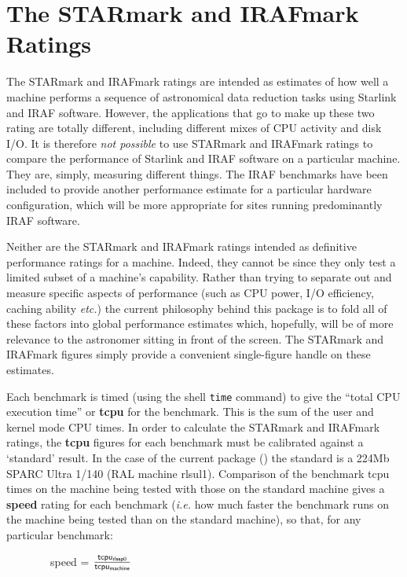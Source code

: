 \newpage
\section{The STARmark and IRAFmark Ratings}
\label{starmark}

The STARmark and IRAFmark ratings are intended as estimates of how well a
machine performs a sequence of astronomical data reduction tasks using
Starlink and IRAF software. However, the applications that go to make up
these two rating are totally different, including different mixes of CPU
activity and disk I/O. It is therefore {\em not possible} to use STARmark
and IRAFmark ratings to compare the performance of Starlink and IRAF
software on a particular machine.  They are, simply, measuring different
things. The IRAF benchmarks have been included to provide another
performance estimate for a particular hardware configuration, which will
be more appropriate for sites running predominantly IRAF software.

Neither are the STARmark and IRAFmark ratings intended as definitive
performance ratings for a machine. Indeed, they cannot be since they
only test a limited subset of a machine's capability.  Rather than
trying to separate out and measure specific aspects of performance
(such as CPU power, I/O efficiency, caching ability {\em etc.}) the
current philosophy behind this package is to fold all of these factors
into global performance estimates which, hopefully, will be of more
relevance to the astronomer sitting in front of the screen.  The
STARmark and IRAFmark figures simply provide a convenient single-figure
handle on these estimates.

Each benchmark is timed (using the shell {\tt time} command) to give
the ``total CPU execution time'' or {\bf tcpu} for the benchmark. This
is the sum of the user and kernel mode CPU times. In order to calculate
the STARmark and IRAFmark ratings, the {\bf tcpu} figures for each
benchmark must be calibrated against a `standard' result.  In the case
of the current package (\pkgver) the standard is a 224Mb SPARC Ultra 1/140
(RAL machine rlsul1). Comparison of the benchmark tcpu times on the
machine being tested with those on the standard machine gives a {\bf
speed} rating for each benchmark ({\em i.e.} how much faster the
benchmark runs on the machine being tested than on the standard
machine), so that, for any particular benchmark:

\vspace{5mm}
\begin{large}
~~~~~~~~speed = $\frac{{\sf tcpu_{rlssp0}}}{{\sf tcpu_{machine}}}$
\end{large}
\vspace{5mm}

